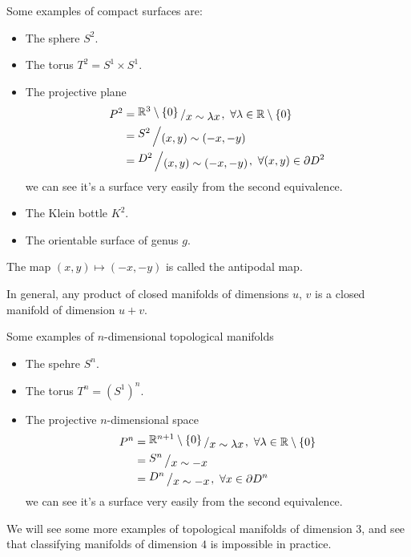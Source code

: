 \documentclass[11pt,a4paper]{article}
\begin{document}
Some examples of compact surfaces are:
\begin{itemize}
  \item The sphere $S^2$.
  \item The torus $T^2 = S^1 \times S^1$.
  \item The projective plane
    \begin{align*}
      P^2 &= \bigslant{\R^3 \setminus \set{0}}{x \sim \lambda x},\ 
        \forall \lambda \in \R \setminus \set{0} \\
      &= \bigslant{S^2}{(x,y) \sim (-x,-y)} \\
      &= \bigslant{D^2}{(x,y) \sim (-x,-y)},\ \forall (x,y) \in \partial D^2
    \end{align*}
  we can see it's a surface very easily from the second equivalence.
  \item The Klein bottle $K^2$.
  \item The orientable surface of genus $g$.
\end{itemize}
\begin{remark}
  The map $(x,y) \mapsto (-x,-y)$ is called the antipodal map.
\end{remark}
\begin{remark}
    In general, any product of closed manifolds of dimensions
    $u$, $v$ is a closed manifold of dimension $u + v$.
\end{remark}


Some examples of $n$-dimensional topological manifolds
\begin{itemize}
  \item The spehre $S^n$.
  \item The torus $T^n = (S^1)^n$.
  \item The projective $n$-dimensional space
    \begin{align*}
      P^n &= \bigslant{\R^{n+1} \setminus \set{0}}{x \sim \lambda x},\ 
        \forall \lambda \in \R \setminus \set{0} \\
      &= \bigslant{S^n}{x \sim -x} \\
      &= \bigslant{D^n}{x \sim -x},\ \forall x \in \partial D^n
    \end{align*}
  we can see it's a surface very easily from the second equivalence.
\end{itemize}
We will see some more examples of topological manifolds of dimension
$3$, and see that classifying manifolds of dimension $4$ is impossible
in practice.
\end{document}
